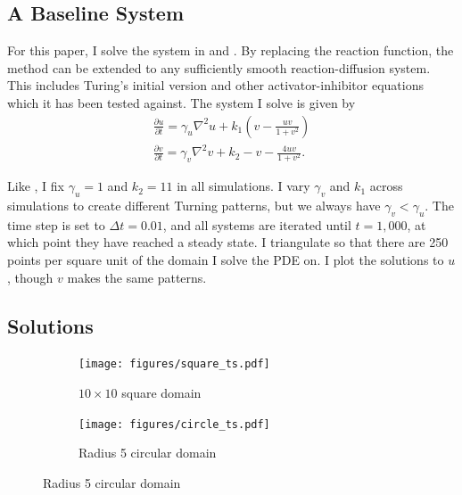 \subsection{A Baseline System}

For this paper, I solve the system in \textcite{othmer2009intersection} and \textcite{jeong2017numerical}. By replacing the reaction function, the method can be extended to any sufficiently smooth reaction-diffusion system. This includes Turing's initial version \parencites{turing1990chemical}{de2020leopard} and other activator-inhibitor equations \parencites{landge2020pattern}{meinhardt2000pattern} which it has been tested against. The system I solve is given by
\begin{align*}
    \frac{\partial u}{\partial t} = \gamma_u \nabla^2 u + k_1 \left(v - \frac{uv}{1 + v^2}\right) \\
    \frac{\partial v}{\partial t} = \gamma_v \nabla^2 v + k_2 - v - \frac{4 u v}{1 + v^2}.
\end{align*}

Like \autocite{jeong2017numerical}, I fix $\gamma_u = 1$ and $k_2 = 11$ in all simulations. I vary $\gamma_v$ and $k_1$ across simulations to create different Turning patterns, but we always have $\gamma_v< \gamma_u$. The time step is set to $\Delta t = 0.01$, and all systems are iterated until $t = 1,000$, at which point they have reached a steady state. I triangulate so that there are 250 points per square unit of the domain I solve the PDE on. I plot the solutions to $u$, though $v$ makes the same patterns.


\subsection{Solutions}

\begin{figure}[t!]
    \centering
    \caption{Solutions to the reaction-diffusion system}

    \begin{subfigure}{\textwidth}
        \centering
        \texttt{[image: figures/square\_ts.pdf]}
        \caption{$10 \times 10$ square domain}
    \end{subfigure}

    \begin{subfigure}{\textwidth}
        \centering
        \texttt{[image: figures/circle\_ts.pdf]}
        \caption{Radius 5 circular domain}
    \end{subfigure}

    \label{fig:sol-ts}
\end{figure}

